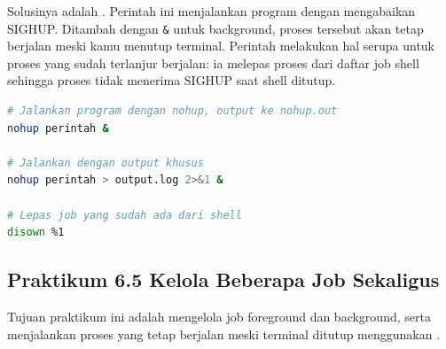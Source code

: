 Solusinya adalah . Perintah ini menjalankan program dengan mengabaikan
SIGHUP. Ditambah dengan \texttt{\&} untuk background, proses tersebut akan tetap berjalan
meski kamu menutup terminal. Perintah  melakukan hal serupa untuk proses yang
sudah terlanjur berjalan: ia melepas proses dari daftar job shell sehingga proses tidak
menerima SIGHUP saat shell ditutup.

\begin{lstlisting}[language=bash, caption={Menjalankan proses tahan logout}]
# Jalankan program dengan nohup, output ke nohup.out
nohup perintah &

# Jalankan dengan output khusus
nohup perintah > output.log 2>&1 &

# Lepas job yang sudah ada dari shell
disown %1
\end{lstlisting}

\subsection*{Praktikum 6.5 Kelola Beberapa Job Sekaligus}

Tujuan praktikum ini adalah mengelola job foreground dan background, serta menjalankan
proses yang tetap berjalan meski terminal ditutup menggunakan .

